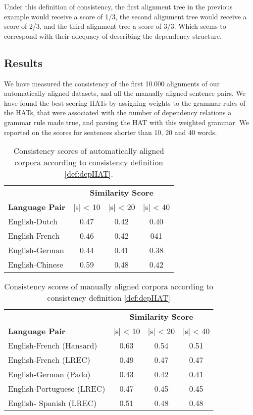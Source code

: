 Under this definition of consistency, the first alignment tree in the previous example would receive a score of 1/3, the second alignment tree would receive a score of 2/3, and the third alignment tree a score of 3/3. Which seems to correspond with their adequacy of describing the dependency structure.

\subsection{Results}

We have measured the consistency of the first 10.000 alignments of our automatically aligned datasets, and all the manually aligned sentence pairs. We have found the best scoring HATs by assigning weights to the grammar rules of the HATs, that were associated with the number of dependency relations a grammar rule made true, and parsing the HAT with this weighted grammar. We reported on the scores for sentences shorter than 10, 20 and 40 words.

\begin{table}[!ht]
\centering
\begin{tabular}{|l|c|c|c|}
\hline
&\multicolumn{3}{c|}{\textbf{Similarity Score}}\\
\textbf{Language Pair} & |s| < 10 & |s| < 20 & |s| < 40\\
\hline \hline
English-Dutch & 0.47 & 0.42 & 0.40 \\
\hline
English-French & 0.46 & 0.42 & 041 \\
\hline
English-German & 0.44 & 0.41 & 0.38 \\
\hline
English-Chinese & 0.59 & 0.48 & 0.42\\
\hline
\end{tabular}
\caption{Consistency scores of automatically aligned corpora according to consistency definition \ref{def:depHAT}.}\label{tab:scores1}
\end{table}

\begin{table}[!ht]
\centering
\begin{tabular}{|l|c|c|c|}
\hline
&\multicolumn{3}{c|}{\textbf{Similarity Score}}\\
\textbf{Language Pair} & |s| < 10 & |s| < 20 & |s| < 40\\
\hline \hline
English-French (Hansard) & 0.63 & 0.54 & 0.51 \\
\hline
English-French (LREC) & 0.49 & 0.47 & 0.47 \\
\hline
English-German (Pado) & 0.43 & 0.42 & 0.41 \\
\hline
English-Portuguese (LREC) & 0.47 & 0.45 & 0.45 \\
\hline
English- Spanish (LREC) & 0.51 & 0.48 & 0.48\\
\hline
\end{tabular}
\caption{Consistency scores of manually aligned corpora according to consistency definition \ref{def:depHAT}}\label{tab:scores2}
\end{table}

